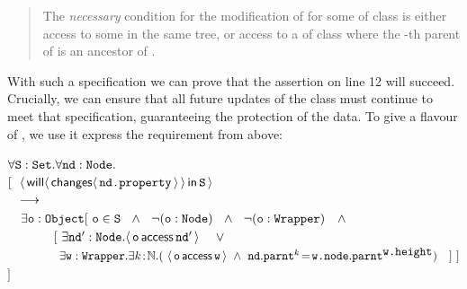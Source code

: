 \begin{quote}
The \emph{necessary} condition for the modification of  for some  of class   is either access to some    in the same tree, or  access to a  of class  where the -th parent of  is an ancestor of .
\end{quote}


With such a specification we can prove that the assertion on line 12
will succeed. Crucially, we can ensure that all future updates of
the  class must continue to meet that specification,
guaranteeing the protection
of the  data. 
%
%
To give a flavour of \Chainmail, we use it  express the requirement from above:
\vspace{.1cm}

\noindent
$\forall {\mbox{\tt{S}}}:{\mbox{\tt{Set}}}.\forall {\mbox{\tt{nd}}}:{\mbox{\tt{Node}}}.$\\
$[\ \ {\langle\, {\mathsf{will}}\langle \,{\mathsf{changes}}\langle\,{\mbox{\tt{nd.property}}}\,\rangle\,\rangle\, \mathsf{in}\, {\mbox{\tt{S}}}\, \rangle}$ \\
$\strut  \ \ \longrightarrow$\\
$\strut \ \ \ \exists {\mbox{\tt{o}}}:{\mbox{\tt{Object}}}[\ {\mbox{\tt{o}}}\in{\mbox{\tt{S}}}\ \ \wedge\ \ \neg({\mbox{\tt{o}}}:{\mbox{\tt{Node}}})\ \ \wedge\  \ \neg({\mbox{\tt{o}}}:{\mbox{\tt{Wrapper}}})\ \ \ \wedge \  $\\
$ \strut\ \ \  \ \ \ \ \ \ \ \ [\ \exists {\mbox{\tt{nd}}}':{\mbox{\tt{Node}}}. \langle\, {\mbox{\tt{o}}}\, \mathsf{access}\, {\mbox{\tt{nd}}}'\, \rangle\  \ \ \  \vee$\\
$ \strut\ \  \ \  \ \  \ \ \ \ \ \ \ \exists {\mbox{\tt{w}}}:{\mbox{\tt{Wrapper}}}.\exists k\!:\!\mathbb{N}.
  (\ \langle\, {\mbox{\tt{o}}}\, \mathsf{access}\, {\mbox{\tt{w}}}\, \rangle  \ \wedge\ {\mbox{\tt{nd}}}.{\mbox{\tt{parnt}}}^k\!=\!{\mbox{\tt{w.node}}}.{\mbox{\tt{parnt}}}^{{\mbox{\tt{w.height}}}}) \ \ \ ]\ ]$\\
$ ]$

\vspace{.1cm}

